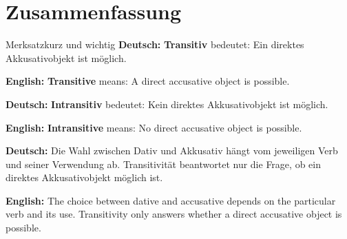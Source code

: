 \documentclass[a4paper,11pt]{article}
\newcommand{\GermanText}[1]{\textbf{Deutsch: }#1\par}
\newcommand{\EnglishText}[1]{{\small\color{SoftGray}\textbf{English: }#1\par}}
\begin{document}
    
    \section{Zusammenfassung}
        
        \begin{grammarentry}{Merksatz}{kurz und wichtig}
            \GermanText{\textbf{Transitiv} bedeutet: Ein direktes Akkusativobjekt ist möglich.}
            \EnglishText{\textbf{Transitive} means: A direct accusative object is possible.}
            
            \GermanText{\textbf{Intransitiv} bedeutet: Kein direktes Akkusativobjekt ist möglich.}
            \EnglishText{\textbf{Intransitive} means: No direct accusative object is possible.}
            
            \GermanText{Die Wahl zwischen Dativ und Akkusativ hängt vom jeweiligen Verb und seiner Verwendung ab. Transitivität beantwortet nur die Frage, ob ein direktes Akkusativobjekt möglich ist.}
            \EnglishText{The choice between dative and accusative depends on the particular verb and its use. Transitivity only answers whether a direct accusative object is possible.}
        \end{grammarentry}
\end{document}
